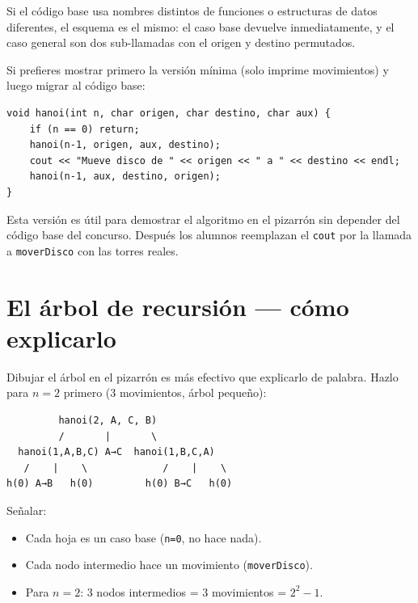 \documentclass[12pt, oneside]{article}
\begin{document}
Si el código base usa nombres distintos de funciones o estructuras
de datos diferentes, el esquema es el mismo: el caso base devuelve
inmediatamente, y el caso general son dos sub-llamadas con el origen
y destino permutados.

\begin{notaprofesor}
  Si prefieres mostrar primero la versión mínima (solo imprime movimientos)
  y luego migrar al código base:

\begin{verbatim}
void hanoi(int n, char origen, char destino, char aux) {
    if (n == 0) return;
    hanoi(n-1, origen, aux, destino);
    cout << "Mueve disco de " << origen << " a " << destino << endl;
    hanoi(n-1, aux, destino, origen);
}
\end{verbatim}

  Esta versión es útil para demostrar el algoritmo en el pizarrón sin
  depender del código base del concurso.  Después los alumnos reemplazan
  el \texttt{cout} por la llamada a \texttt{moverDisco} con las torres reales.
\end{notaprofesor}

\section{El árbol de recursión — cómo explicarlo}

Dibujar el árbol en el pizarrón es más efectivo que explicarlo de palabra.
Hazlo para $n = 2$ primero (3 movimientos, árbol pequeño):

\begin{verbatim}
         hanoi(2, A, C, B)
         /       |       \
  hanoi(1,A,B,C) A→C  hanoi(1,B,C,A)
   /    |    \             /    |    \
h(0) A→B   h(0)         h(0) B→C   h(0)
\end{verbatim}

Señalar:
\begin{itemize}
  \item Cada hoja es un caso base (\texttt{n=0}, no hace nada).
  \item Cada nodo intermedio hace un movimiento (\texttt{moverDisco}).
  \item Para $n=2$: 3 nodos intermedios = 3 movimientos = $2^2 - 1$.
\end{itemize}
\end{document}
